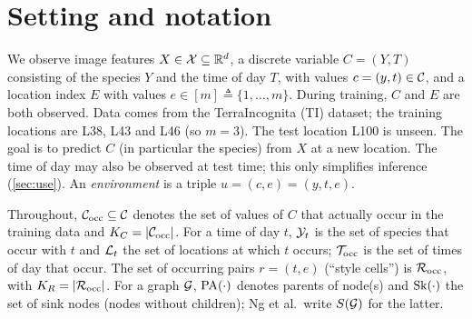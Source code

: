 \section{Setting and notation}
\label{sec:setting}

We observe image features $X \in \mathcal{X} \subseteq \mathbb{R}^{d}$, a discrete variable $C=(Y,T)$ 
consisting of the species $Y$ and the time of day $T$, with values $c=(y,t)\in\mathcal{C}$, and a location 
index $E$ with values $e \in [m] \triangleq \{1,\dots,m\}$.
During training, $C$ and $E$ are both observed. Data comes from the TerraIncognita (TI) dataset; 
the training locations are L38, L43 and L46 (so $m=3$). The test location L100 is unseen. 
The goal is to predict $C$ (in particular the species) from
$X$ at a new location. The time of day may also be observed at test time; this only simplifies
inference (\cref{sec:use}). An \emph{environment} is a triple $u=(c,e)=(y,t,e)$.

Throughout, $\mathcal{C}_{\mathrm{occ}}\subseteq\mathcal{C}$ denotes the set of values of $C$ that actually occur in
the training data and $K_C=|\mathcal{C}_{\mathrm{occ}}|$. For a time of day $t$, $\mathcal{Y}_t$ is the set of
species that occur with $t$ and $\mathcal{L}_t$ the set of locations at which $t$ occurs; $\mathcal{T}_{\mathrm{occ}}$ is
the set of times of day that occur. The set of occurring pairs $r=(t,e)$ (``style cells'') is
$\mathcal{R}_{\mathrm{occ}}$, with $K_R=|\mathcal{R}_{\mathrm{occ}}|$. For a graph $\mathcal{G}$, $\mathrm{PA}(\cdot)$ denotes parents of node(s) and $\mathrm{Sk}(\cdot)$ the set of sink nodes (nodes without children); Ng et al.\ write $S(\mathcal{G})$ for the latter.

